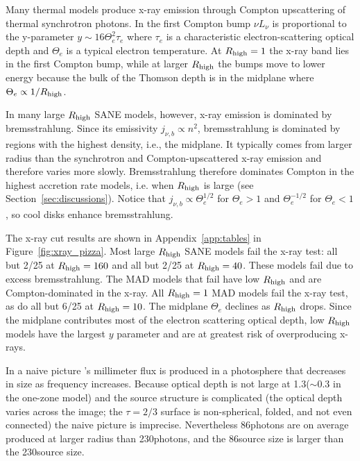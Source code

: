 Many thermal models produce x-ray emission through Compton upscattering of thermal synchrotron photons.  In the first Compton bump $\nu L_\nu$ is proportional to the y-parameter $y \sim 16 \Theta_e^2 \tau_e$ where $\tau_e$ is a characteristic electron-scattering optical depth and $\Theta_e$ is a typical electron temperature.  At $R_\mathrm{high} = 1$ the x-ray band lies in the first Compton bump, while at larger $R_\mathrm{high}$ the bumps move to lower energy because the bulk of the Thomson depth is in the midplane where $\Theta_e \propto 1/R_\mathrm{high}$.

In many large $R_\mathrm{high}$ SANE models, however, x-ray emission is dominated by bremsstrahlung.  Since its emissivity $j_{\nu,b} \propto n^2$, bremsstrahlung is dominated by regions with the highest density, i.e., the midplane.  It typically comes from larger radius than the synchrotron and Compton-upscattered x-ray emission and therefore varies more slowly.  Bremsstrahlung therefore dominates Compton in the highest accretion rate models, i.e. when $R_\mathrm{high}$ is large (see Section~\ref{sec:discussions}).  Notice that $j_{\nu,b} \propto \Theta_e^{1/2}$ for $\Theta_e > 1$ and $\Theta_e^{-1/2}$ for $\Theta_e < 1$, so cool disks enhance bremsstrahlung.

The x-ray cut results are shown in Appendix~\ref{app:tables} in Figure~\ref{fig:xray_pizza}. Most large $R_\mathrm{high}$ SANE models fail the x-ray test: all but 2/25 at $R_\mathrm{high} = 160$ and all but 2/25 at $R_\mathrm{high} = 40$.  These models fail due to excess bremsstrahlung. The MAD models that fail have low $R_\mathrm{high}$ and are Compton-dominated in the x-ray.  All $R_\mathrm{high} = 1$ MAD models fail the x-ray test, as do all but 6/25 at $R_\mathrm{high} = 10$.  The midplane $\Theta_e$ declines as $R_\mathrm{high}$ drops.  Since the midplane contributes most of the electron scattering optical depth, low $R_\mathrm{high}$ models have the largest $y$ parameter and are at greatest risk of overproducing x-rays.



In a naive picture \sgra's millimeter flux is produced in a photosphere that decreases in size as frequency increases.  Because optical depth is not large at 1.3\mm ($\sim 0.3$ in the one-zone model) and the source structure is complicated (the optical depth varies across the image; the $\tau = 2/3$ surface is non-spherical, folded, and not even connected) the naive picture is imprecise.  Nevertheless 86\GHz photons are on average produced at larger radius than 230\GHz photons, and the 86\GHz source size is larger than the 230\GHz source size.

